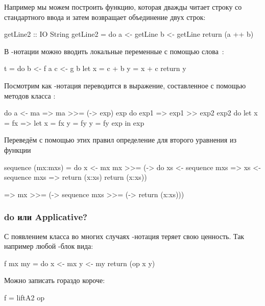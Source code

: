 Например мы можем построить функцию, которая дважды читает строку со
стандартного ввода и затем возвращает объединение двух строк:


\begin{code}
getLine2 :: IO String
getLine2 = do
    a <- getLine
    b <- getLine
    return (a ++ b)
\end{code}

В -нотации можно вводить локальные переменные с помощью
\mbox{слова }:


\begin{code}
t = do
    b <- f a
    c <- g b
    let x = c + b
        y = x + c
    return y
\end{code}

Посмотрим как -нотация переводится в выражение, составленное с
помощью методов класса :


\begin{code}
do
    a <- ma     =>   ma >>= (\a -> exp)
    exp
do
    exp1        =>   exp1 >> exp2
    exp2    
do
    let x = fx  =>   let x = fx
        y = fy           y = fy
    exp              in  exp
\end{code}

Переведём с помощью этих правил определение для второго уравнения из
функции 


\begin{code}
sequence (mx:mxs) = do
    x   <- mx                  mx >>= (\x -> do  
    xs  <- sequence mxs   =>              xs <- sequence mxs    =>    
    return (x:xs)                         return (x:xs))

=>     mx >>= (\x -> sequence mxs >>= (\xs -> return (x:xs)))
\end{code}

\subsubsection{do или Applicative?}

С появлением класса  во многих случаях -нотация
теряет свою ценность. Так например любой -блок вида:


\begin{code}
f mx my = do
    x <- mx 
    y <- my
    return (op x y)
\end{code}

Можно записать гораздо короче:


\begin{code}
f = liftA2 op 
\end{code}

